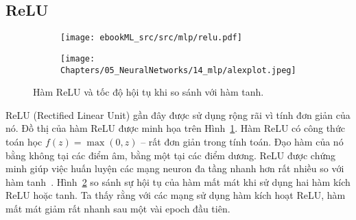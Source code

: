  
 
\subsection{ReLU}
 
\begin{figure}[t]
    \begin{subfigure}{0.49\textwidth}
    \texttt{[image: ebookML\_src/src/mlp/relu.pdf]}
    \caption{}
    \label{fig:14_6a}
    \end{subfigure}
    \begin{subfigure}{0.49\textwidth}
    \texttt{[image: Chapters/05\_NeuralNetworks/14\_mlp/alexplot.jpeg]}
    \caption{}
    \label{fig:14_6b}
    \end{subfigure}
    \caption{
     Hàm ReLU và tốc độ hội tụ khi so sánh với hàm tanh.
    }
    \label{fig:14_6}
\end{figure}

ReLU (Rectified Linear Unit) gần đây được sử dụng rộng rãi vì tính đơn giản của
nó. Đồ thị của hàm ReLU được minh họa trên Hình~\ref{fig:14_6a}. Hàm ReLU có
công thức toán học $f(z) = \max(0, z)$ -- rất đơn giản trong tính toán.
Đạo hàm của nó bằng không tại các điểm âm, bằng một tại các điểm dương. ReLU được
chứng minh giúp việc huấn luyện các mạng neuron đa tầng nhanh hơn rất nhiều so với hàm
tanh~\cite{krizhevsky2012imagenet}. Hình~\ref{fig:14_6b} so sánh sự hội tụ của
hàm mất mát khi sử dụng hai hàm kích ReLU hoặc tanh. Ta thấy rằng với các mạng sử dụng hàm kích hoạt ReLU, hàm mất mát giảm rất nhanh sau một vài epoch đầu tiên. 



 

